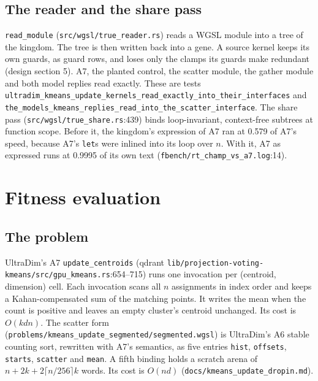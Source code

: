 \documentclass[sigconf,nonacm]{acmart}
\newcommand{\code}[1]{\nolinkurl{#1}}
\newcommand{\src}[1]{{\footnotesize\nolinkurl{#1}}}
\begin{document}
\subsection{The reader and the share pass}
\label{sec:spelling}
\code{read_module} (\src{src/wgsl/true_reader.rs}) reads a WGSL module into
a tree of the kingdom. The tree is then written back into a gene. A source
kernel keeps its own guards, as guard rows, and loses only the clamps its
guards make redundant (design section 5). A7, the planted control, the
scatter module, the gather module and both model replies read exactly. These
are tests \code{ultradim_kmeans_update_kernels_read_exactly_into_their_interfaces}
and \code{the_models_kmeans_replies_read_into_the_scatter_interface}.
The share pass (\src{src/wgsl/true_share.rs}:439) binds loop-invariant,
context-free subtrees at function scope. Before it, the kingdom's expression of
A7 ran at 0.579 of A7's speed, because A7's \code{let}s were inlined into its
loop over $n$. With it, A7 as expressed runs at 0.9995 of its own text
(\src{fbench/rt_champ_vs_a7.log}:14).

\section{Fitness evaluation}
\label{sec:eval}

\subsection{The problem}
UltraDim's A7 \code{update_centroids} (qdrant
\src{lib/projection-voting-kmeans/src/gpu_kmeans.rs}:654--715) runs one
invocation per (centroid, dimension) cell. Each invocation scans all $n$
assignments in index order and keeps a Kahan-compensated \cite{kahan1965} sum
of the matching points. It writes the mean when the count is positive and
leaves an empty cluster's centroid unchanged. Its cost is $O(kdn)$. The scatter
form (\src{problems/kmeans_update_segmented/segmented.wgsl}) is UltraDim's A6
stable counting sort, rewritten with A7's semantics, as five entries
\code{hist}, \code{offsets}, \code{starts}, \code{scatter} and \code{mean}. A
fifth binding holds a scratch arena of $n+2k+2\lceil n/256\rceil k$ words.
Its cost is $O(nd)$ (\src{docs/kmeans_update_dropin.md}).
\end{document}

